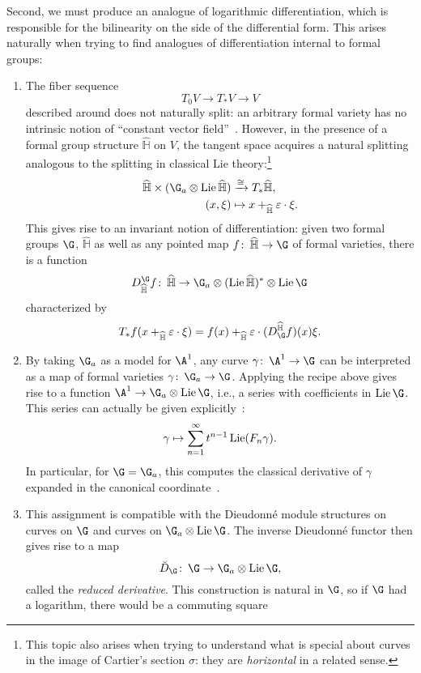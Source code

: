 Second, we must produce an analogue of logarithmic differentiation, which is responsible for the bilinearity on the side of the differential form.  This arises naturally when trying to find analogues of differentiation internal to formal groups:
\begin{enumerate}
    \item The fiber sequence \[T_0 V \to T_* V \to V\] described around  does not naturally split: an arbitrary formal variety has no intrinsic notion of ``constant vector field''~\cite[V.11.12]{LazardCFGs}.  However, in the presence of a formal group structure \(\widehat{\mathbb H}\) on \(V\), the tangent space acquires a natural splitting analogous to the splitting in classical Lie theory:\footnote{This topic also arises when trying to understand what is special about curves in the image of Cartier's section \(\sigma\): they are \emph{horizontal} in a related sense.}
    \begin{align*}
    \widehat{\mathbb H} \times (\G_a \otimes \Lie \widehat{\mathbb H}) & \xrightarrow{\cong} T_* \widehat{\mathbb H}, \\
    (x, \xi) & \mapsto x +_{\widehat{\mathbb H}} \eps \cdot \xi.
    \end{align*}
    This gives rise to an invariant notion of differentiation: given two formal groups \(\G\), \(\widehat{\mathbb H}\) as well as any pointed map \(f\co \widehat{\mathbb H} \to \G\) of formal varieties, there is a function \[D_{\widehat{\mathbb H}}^{\G} f\co \widehat{\mathbb H} \to \G_a \otimes (\Lie \widehat{\mathbb H})^* \otimes \Lie \G\] characterized by \[T_* f(x +_{\widehat{\mathbb H}} \eps \cdot \xi) = f(x) +_{\widehat{\mathbb H}} \eps \cdot (D_{\G}^{\widehat{\mathbb H}} f)(x) \xi.\]
    \item By taking \(\G_a\) as a model for \(\A^1\), any curve \(\gamma\co \A^1 \to \G\) can be interpreted as a map of formal varieties \(\gamma\co \G_a \to \G\).  Applying the recipe above gives rise to a function \(\A^1 \to \G_a \otimes \Lie \G\), i.e., a series with coefficients in \(\Lie \G\).  This series can actually be given explicitly~\cite[V.7.3]{LazardCFGs}: \[\gamma \mapsto \sum_{n=1}^\infty t^{n-1} \operatorname{Lie}(F_n \gamma).\]  In particular, for \(\G = \G_a\), this computes the classical derivative of \(\gamma\) expanded in the canonical coordinate~\cite[V.7.13]{LazardCFGs}.
    \item This assignment is compatible with the Dieudonn\'e module structures on curves on \(\G\) and curves on \(\G_a \otimes \Lie \G\).  The inverse Dieudonn\'e functor then gives rise to a map \[\breve D_{\G}\co \G \to \G_a \otimes \Lie \G,\] called the \textit{reduced derivative}.  This construction is natural in \(\G\), so if \(\G\) had a logarithm, there would be a commuting square

\end{enumerate}

